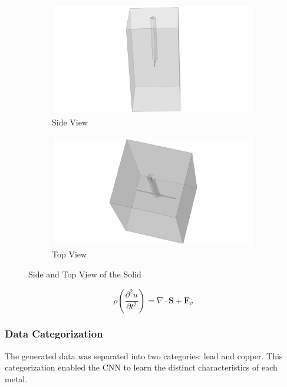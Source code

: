 \begin{figure}[t]
    \centering
    \begin{subfigure}[b]{0.4\textwidth}
        \centering
        \includegraphics[width=\textwidth]{./Model_Image.png}
        \caption{Side View}
        \label{fig:sub1}
    \end{subfigure}
    \hfill
    \begin{subfigure}[b]{0.4\textwidth}
        \centering
        \includegraphics[width=\textwidth]{./Model_Image_12.png}
        \caption{Top View}
        \label{fig:sub2}
    \end{subfigure}
    \caption{Side and Top View of the Solid}
    \label{fig:main}
\end{figure}


\begin{equation}
  \rho \left( \frac{\partial^2 u}{\partial t^2} \right) = \nabla \cdot \mathbf{S} + \mathbf{F}_v
\end{equation}


\subsubsection{Data Categorization}
The generated data was separated into two categories: lead and copper. This categorization enabled the CNN to learn the distinct characteristics of each metal.

